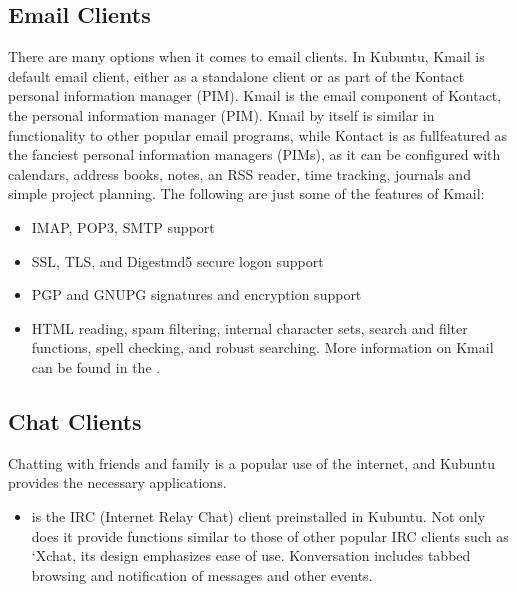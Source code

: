 \documentclass[letterpaper,10pt,english]{sphinxmanual}
\begin{document}
\subsection{Email Clients}
\label{\detokenize{docs/software:email-clients}}
\sphinxAtStartPar
There are many options when it comes to email clients. In Kubuntu, Kmail is default email client, either as a stand\sphinxhyphen{}alone client or as part of the Kontact personal information manager (PIM). Kmail is the email component of Kontact, the  personal information manager (PIM). Kmail by itself is similar in functionality to other popular email programs, while Kontact is as full\sphinxhyphen{}featured as the fanciest personal information managers (PIMs), as it can be configured with calendars, address books, notes, an RSS reader, time tracking, journals and simple project planning. The following are just some of the features of Kmail:
\begin{itemize}
\item {} 
\sphinxAtStartPar
IMAP, POP3, SMTP support

\item {} 
\sphinxAtStartPar
SSL, TLS, and Digest\sphinxhyphen{}md5 secure logon support

\item {} 
\sphinxAtStartPar
PGP and GNUPG signatures and encryption support

\item {} 
\sphinxAtStartPar
HTML reading, spam filtering, internal character sets, search and filter functions, spell checking, and robust searching. More information on Kmail can be found in the .

\end{itemize}


\subsection{Chat Clients}
\label{\detokenize{docs/software:chat-clients}}
\sphinxAtStartPar
Chatting with friends and family is a popular use of the internet, and Kubuntu provides the necessary applications.
\begin{itemize}
\item {} 
\sphinxAtStartPar
{} is the IRC (Internet Relay Chat) client pre\sphinxhyphen{}installed in Kubuntu. Not only does it provide functions similar to those of other popular IRC clients such as ‘X\sphinxhyphen{}chat, its design emphasizes ease of use. Konversation includes tabbed browsing and notification of messages and other events.

\end{itemize}
\end{document}
